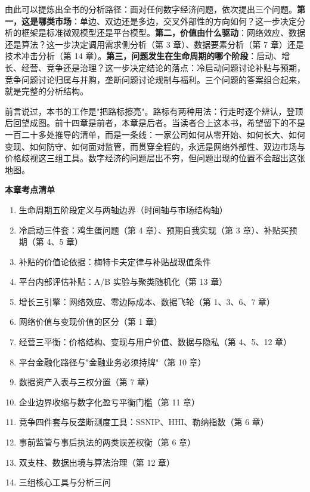 由此可以提炼出全书的分析路径：面对任何数字经济问题，依次提出三个问题。\textbf{第一，这是哪类市场}：单边、双边还是多边，交叉外部性的方向如何？这一步决定分析的框架是标准微观模型还是平台模型。\textbf{第二，价值由什么驱动}：网络效应、数据还是算法？这一步决定调用需求侧分析（第 3 章）、数据要素分析（第 7 章）还是技术冲击分析（第 14 章）。\textbf{第三，问题发生在生命周期的哪个阶段}：启动、增长、经营、竞争还是治理？这一步决定结论的落点：冷启动问题讨论补贴与预期，竞争问题讨论归属与并购，垄断问题讨论规制与福利。三个问题的答案组合起来，就是完整的分析结构。

前言说过，本书的工作是"把路标擦亮"。路标有两种用法：行走时逐个辨认，登顶后回望成图。前十四章是前者，本章是后者。当读者合上这本书，希望留下的不是一百二十多处推导的清单，而是一条线：一家公司如何从零开始、如何长大、如何变现、如何防守、如何面对监管，而贯穿全程的，永远是网络外部性、双边市场与价格歧视这三组工具。数字经济的问题层出不穷，但问题出现的位置不会超出这张地图。

\begin{chapterbox}
\textbf{本章考点清单}

\begin{enumerate}
\item 生命周期五阶段定义与两轴边界（时间轴与市场结构轴）
\item 冷启动三件套：鸡生蛋问题（第 4 章）、预期自我实现（第 3 章）、补贴买预期（第 4、5 章）
\item 补贴的价值论依据：梅特卡夫定律与补贴战现值条件 
\item 平台内部评估补贴：A/B 实验与聚类随机化（第 13 章）
\item 增长三引擎：网络效应、零边际成本、数据飞轮（第 1、3、6、7 章）
\item 网络价值与变现价值的区分（第 1 章）
\item 经营三平衡：价格结构、变现与用户价值、数据与隐私（第 4、5、12 章）
\item 平台金融化路径与"金融业务必须持牌"（第 10 章）
\item 数据资产入表与三权分置（第 7 章）
\item 企业边界收缩与数字化盈亏平衡门槛（第 11 章）
\item 竞争四件套与反垄断测度工具：SSNIP、HHI、勒纳指数（第 6 章）
\item 事前监管与事后执法的两类误差权衡（第 6 章）
\item 双支柱、数据出境与算法治理（第 12 章）
\item 三组核心工具与分析三问 
\end{enumerate}
\end{chapterbox}

